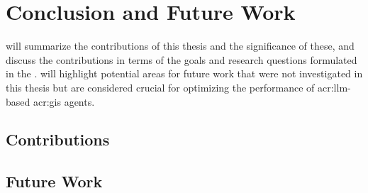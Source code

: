 \chapter{Conclusion and Future Work}
\label{cha:conclusion}

 will summarize the contributions of this thesis and the significance of these, and discuss the contributions in terms of the goals and research questions formulated in the .  will highlight potential areas for future work that were not investigated in this thesis but are considered crucial for optimizing the performance of \acrshort{acr:llm}-based \acrshort{acr:gis} agents.

\section{Contributions}
\label{sec:contributions}

\begin{comment}
What are the main contributions made to the field?
How significant are these contributions?
Also discuss the contributions in terms of the goals and research questions formulated in the Introduction.

The contributions section will normally contain everything that you address in the abstract, but in an extended form and quite possibly additional issues that cannot be included in the abstract.
An obvious difference is that when the reader has come this far in the text, she/he should be quite familiar with the work, but while reading the abstract they will have little to no knowledge of the work.

The section ``Contributions'' in Chapter~\ref{cha:introduction} differs from this one in that the former is just a list of the main bits, while this section should explain them in more detail.
However, basically the same items should appear in both sections.
\end{comment}

\section{Future Work}
\label{sec:future-work}

\begin{comment}
Consider where you would like to extend or improve this work, or how somebody else could continue it.
These extensions might either be continuing the ongoing direction or taking a side direction that became obvious during the work.
Further, possible solutions to limitations in the work conducted, highlighted in Section~\ref{sec:discussion} may be presented.

Note that in the Specialisation Project Report, the Future Work section will be a key part of your plan for the novel work to be carried out in the next semester,
while in the Master's Thesis, the Future Work section rather will point to issues that others might be interested in addressing.
This can include options and alternatives that you did not try out yourself, or potential improvements and extensions to your experiments or system.
\end{comment}

